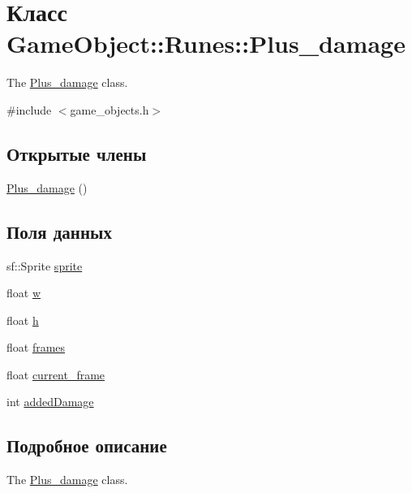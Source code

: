 \hypertarget{classGameObject_1_1Runes_1_1Plus__damage}{}\section{Класс Game\+Object\+:\+:Runes\+:\+:Plus\+\_\+damage}
\label{classGameObject_1_1Runes_1_1Plus__damage}


The \hyperlink{classGameObject_1_1Runes_1_1Plus__damage}{Plus\+\_\+damage} class.  




{\ttfamily \#include $<$game\+\_\+objects.\+h$>$}

\subsection*{Открытые члены}
\begin{DoxyCompactItemize}
\item 
\hyperlink{classGameObject_1_1Runes_1_1Plus__damage_a9ed01c21040fda145bc262ca6c2d9822}{Plus\+\_\+damage} ()
\end{DoxyCompactItemize}
\subsection*{Поля данных}
\begin{DoxyCompactItemize}
\item 
sf\+::\+Sprite \hyperlink{classGameObject_1_1Runes_1_1Plus__damage_a1286be03fc1312928d408528f8bddf25}{sprite}
\item 
float \hyperlink{classGameObject_1_1Runes_1_1Plus__damage_a67e0a90ac6bd68ecca36ef410c87a505}{w}
\item 
float \hyperlink{classGameObject_1_1Runes_1_1Plus__damage_acb2903ce736dae31e937abbf7cb132b4}{h}
\item 
float \hyperlink{classGameObject_1_1Runes_1_1Plus__damage_a09b7ecb5d9db3dad1942c5c3d08299f5}{frames}
\item 
float \hyperlink{classGameObject_1_1Runes_1_1Plus__damage_a1993229d8a137d5dc6feb4b572a98bc0}{current\+\_\+frame}
\item 
int \hyperlink{classGameObject_1_1Runes_1_1Plus__damage_a8d6f33861ad270c2f0c01abea24fd432}{added\+Damage}
\end{DoxyCompactItemize}


\subsection{Подробное описание}
The \hyperlink{classGameObject_1_1Runes_1_1Plus__damage}{Plus\+\_\+damage} class. 


